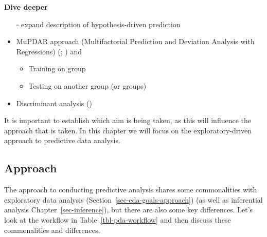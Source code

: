 \documentclass[
  letterpaper,
  DIV=11,
  numbers=noendperiod]{scrreprt}
\providecommand{\tightlist}{%
  \setlength{\itemsep}{0pt}\setlength{\parskip}{0pt}}\usepackage{longtable,booktabs,array}
\theoremstyle{definition}
\theoremstyle{remark}
\begin{document}
\begin{tcolorbox}[enhanced jigsaw, leftrule=.75mm, colframe=quarto-callout-color-frame, colback=white, rightrule=.15mm, opacityback=0, arc=.35mm, breakable, bottomrule=.15mm, left=2mm, toprule=.15mm]

\textbf{ Dive deeper}

\begin{itemize}
\item[$\square$]
  expand description of hypothesis-driven prediction
\item
  MuPDAR approach (Multifactorial Prediction and Deviation Analysis with
  Regressions) (;
  ) and

  \begin{itemize}
  \tightlist
  \item
    Training on group
  \item
    Testing on another group (or groups)
  \end{itemize}
\item
  Discriminant analysis ()
\end{itemize}

\end{tcolorbox}

It is important to establish which aim is being taken, as this will
influence the approach that is taken. In this chapter we will focus on
the exploratory-driven approach to predictive data analysis.

\subsection{Approach}\label{sec-pda-approach}

The approach to conducting predictive analysis shares some commonalities
with exploratory data analysis (Section~\ref{sec-eda-goals-approach})
(as well as inferential analysis Chapter~\ref{sec-inference}), but there
are also some key differences. Let's look at the workflow in
Table~\ref{tbl-pda-workflow} and then discuss these commonalities and
differences.
\end{document}
